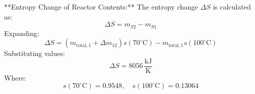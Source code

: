 **Entropy Change of Reactor Contents:**  
The entropy change \( \Delta S \) is calculated as:  
\[
\Delta S = m_{S2} - m_{S1}
\]  
Expanding:  
\[
\Delta S = \left( m_{\text{total},1} + \Delta m_{12} \right) s(70^\circ\text{C}) - m_{\text{total},1} s(100^\circ\text{C})
\]  
Substituting values:  
\[
\Delta S = 8056 \, \frac{\text{kJ}}{\text{K}}
\]  
Where:  
\[
s(70^\circ\text{C}) = 0.9548, \quad s(100^\circ\text{C}) = 0.13064
\]